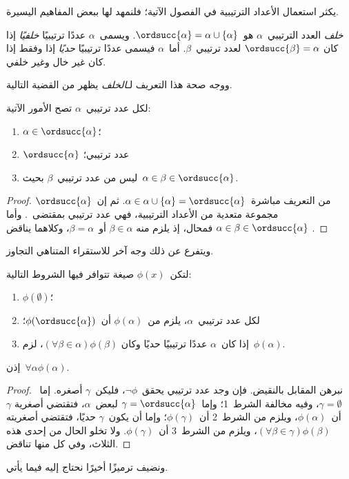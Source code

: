 \documentclass[../../../include/open-logic-section]{subfiles}
\begin{document}

يكثر استعمال الأعداد الترتيبية في الفصول الآتية؛ فلنمهد لها ببعض
المفاهيم اليسيرة.

\begin{defn}
\emph{خلف} العدد الترتيبي~$\alpha$ هو~$\ordsucc{\alpha} =\alpha \cup \{\alpha\}$.
ويسمى~$\alpha$ عددًا ترتيبيًا \emph{خلفيًا} إذا كان
$\ordsucc{\beta} = \alpha$ لعدد ترتيبي~$\beta$. أما~$\alpha$ فيسمى
عددًا ترتيبيًا \emph{حديًا} إذا وفقط إذا كان غير خال وغير خلفي.
\end{defn}
\noindent
ووجه صحة هذا التعريف لـ\emph{الخلف} يظهر من القضية التالية.

\begin{prop}
لكل عدد ترتيبي~$\alpha$ تصح الأمور الآتية:
\begin{enumerate}
\item $\alpha \in \ordsucc{\alpha}$؛
\item $\ordsucc{\alpha}$ عدد ترتيبي؛
\item ليس من عدد ترتيبي~$\beta$ بحيث~$\alpha \in \beta \in \ordsucc{\alpha}$.
\end{enumerate}
\end{prop}

\begin{proof}
من التعريف مباشرة~$\alpha \in \alpha \cup \{\alpha\} = \ordsucc{\alpha}$.
ثم إن~$\ordsucc{\alpha}$ مجموعة متعدية من الأعداد الترتيبية، فهي
عدد ترتيبي بمقتضى~. وأما
$\alpha \in \beta \in \ordsucc{\alpha}$ فمحال، إذ يلزم منه
$\beta \in \alpha$ أو~$\beta = \alpha$، وكلاهما يناقض
.
\end{proof}
\noindent
ويتفرع عن ذلك وجه آخر للاستقراء المتناهي التجاوز.

\begin{thm}
لتكن~$\phi(x)$ صيغة تتوافر فيها الشروط التالية:
\begin{enumerate}
\item $\phi(\emptyset)$؛
\item لكل عدد ترتيبي~$\alpha$، يلزم من~$\phi(\alpha)$ أن~$\phi(\ordsucc{\alpha})$؛
\item إذا كان~$\alpha$ عددًا ترتيبيًا حديًا وكان
$(\forall \beta \in \alpha)\phi(\beta)$، لزم~$\phi(\alpha)$.
\end{enumerate}
إذن~$\forall \alpha \phi(\alpha)$.
\end{thm}

\begin{proof}
نبرهن المقابل بالنقيض. فإن وجد عدد ترتيبي يحقق~$\lnot\phi$،
فليكن~$\gamma$ أصغره. إما~$\gamma = \emptyset$، وفيه مخالفة الشرط~1؛
وإما~$\gamma = \ordsucc{\alpha}$ لبعض~$\alpha$، فتقتضي أصغرية
$\gamma$ أن~$\phi(\alpha)$، ويلزم من الشرط~2 أن~$\phi(\gamma)$؛
وإما أن يكون~$\gamma$ حديًا، فتقتضي أصغريته
$(\forall \beta \in \gamma)\phi(\beta)$، ويلزم من الشرط~3 أن~$\phi(\gamma)$.
ولا تخلو الحال من إحدى هذه الثلاث، وفي كل منها تناقض.
\end{proof}
\noindent
ونضيف ترميزًا أخيرًا نحتاج إليه فيما يأتي.
\end{document}
